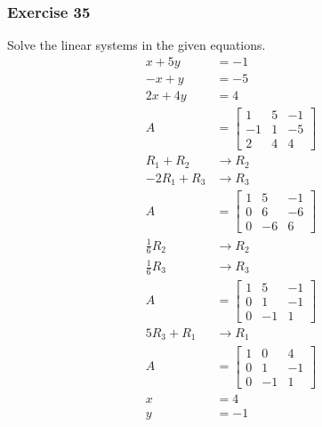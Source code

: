 \documentclass[letterpaper, 12pt]{math}
\begin{document}
\subsubsection*{Exercise 35}
Solve the linear systems in the given equations.
\begin{align*}
  x+5y &= -1 \\
  -x+y &= -5 \\
  2x+4y &= 4 \\
  A &= \left[\begin{array}{cc|c}
    1 & 5 & -1 \\
    -1 & 1 & -5 \\
    2 & 4 & 4
  \end{array}\right] \\
  R_1+R_2 &\to R_2 \\
  -2R_1+R_3 &\to R_3 \\
  A &= \left[\begin{array}{cc|c}
    1 & 5 & -1 \\
    0 & 6 & -6 \\
    0 & -6 & 6
  \end{array}\right] \\
  \frac{1}{6}R_2 &\to R_2 \\
  \frac{1}{6}R_3 &\to R_3 \\
  A &= \left[\begin{array}{cc|c}
    1 & 5 & -1 \\
    0 & 1 & -1 \\
    0 & -1 & 1
  \end{array}\right] \\
  5R_3+R_1 &\to R_1 \\
  A &= \left[\begin{array}{cc|c}
    1 & 0 & 4 \\
    0 & 1 & -1 \\
    0 & -1 & 1
  \end{array}\right] \\
  x &= 4 \\
  y &= -1
\end{align*}
\end{document}
